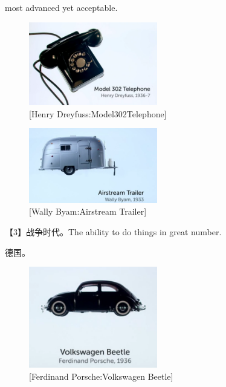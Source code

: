 \documentclass[UTF8]{../RepresentationUniverse}
\begin{document}
most advanced yet acceptable. 



\begin{figure}[h]
    \centering
    \includegraphics[width=0.5\textwidth]{./src/figures/Model302Telephone_2023-04-09_19-31-13.png}
    \caption{[Henry Dreyfuss:Model302Telephone]}
    \label{figure:Model302Telephone}
\end{figure}


\begin{figure}[h]
    \centering
    \includegraphics[width=0.5\textwidth]{./src/figures/Airstream Trailer_2023-04-09_19-34-02.png}
    \caption{[Wally Byam:Airstream Trailer]}
    \label{figure:Airstream Trailer}
\end{figure}


【3】战争时代。The ability to do things in great number.

德国。


\begin{figure}[h]
    \centering
    \includegraphics[width=0.5\textwidth]{./src/figures/Volkswagen Beetle_2023-04-09_19-47-01.png}
    \caption{[Ferdinand Porsche:Volkswagen Beetle]}
    \label{figure:Volkswagen Beetle}
\end{figure}
\end{document}

